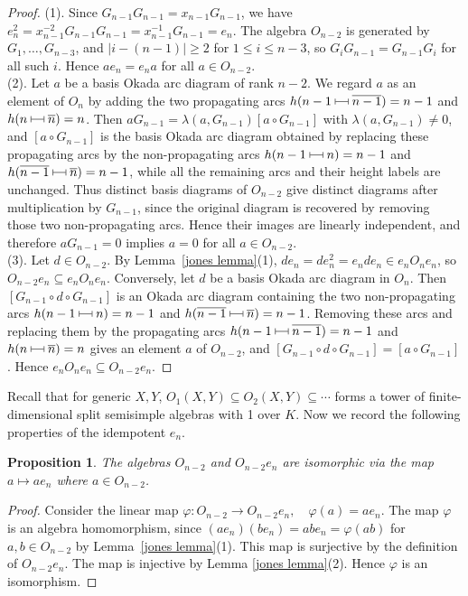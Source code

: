 \documentclass[12pt,reqno]{amsart}
\numberwithin{equation}{section}
\newtheorem{proposition}[theorem]{Proposition}
\theoremstyle{definition}
\theoremstyle{definition}
\newcommand{\arcjoin}{\mathrel{%
  \rule[0.1ex]{0.4pt}{1.1ex}%
  \rule[0.6ex]{1em}{0.4pt}%
  \rule[0.1ex]{0.4pt}{1.1ex}%
}}
\begin{document}
\begin{proof}
(1). Since $G_{n-1}G_{n-1}=x_{n-1}G_{n-1}$, we have
$e_n^2=x_{n-1}^{-2}G_{n-1}G_{n-1}=x_{n-1}^{-1}G_{n-1}=e_n$.
The algebra $O_{n-2}$ is generated by $G_1,\ldots,G_{n-3}$, and
$|i-(n-1)|\geq 2$ for $1\leq i\leq n-3$, so $G_iG_{n-1}=G_{n-1}G_i$ for all
such $i$. Hence $ae_n=e_na$ for all $a\in O_{n-2}$.
\vspace{2mm}
\\\noindent
(2). Let $a$ be a basis Okada arc diagram of rank $n-2$. We regard $a$ as an
element of $O_n$ by adding the two propagating arcs
$h(n-1\arcjoin\overline{n-1})=n-1$ and $h(n\arcjoin\overline n)=n$. Then
$aG_{n-1}=\lambda(a,G_{n-1})[a\circ G_{n-1}]$ with $\lambda(a,G_{n-1})\neq0$,
and $[a\circ G_{n-1}]$ is the basis Okada arc diagram obtained by replacing
these propagating arcs by the non-propagating arcs $h(n-1\arcjoin n)=n-1$ and
$h(\overline{n-1}\arcjoin\overline n)=n-1$, while all the remaining arcs and
their height labels are unchanged. Thus distinct basis diagrams of $O_{n-2}$
give distinct diagrams after multiplication by $G_{n-1}$, since the original
diagram is recovered by removing those two non-propagating arcs. Hence their
images are linearly independent, and therefore $aG_{n-1}=0$ implies $a=0$ for
all $a\in O_{n-2}$.
\vspace{2mm}
\\\noindent
(3). Let $d\in O_{n-2}$. By Lemma~\ref{jones lemma}(1), $de_n=de_n^2=e_nde_n\in e_nO_ne_n$, so
$O_{n-2}e_n\subseteq e_nO_ne_n$. Conversely, let $d$ be a basis Okada arc
diagram in $O_n$. Then $[G_{n-1}\circ d\circ G_{n-1}]$ is an Okada arc diagram
containing the two non-propagating arcs $h(n-1\arcjoin n)=n-1$ and
$h(\overline{n-1}\arcjoin\overline n)=n-1$. Removing these arcs and replacing
them by the propagating arcs $h(n-1\arcjoin\overline{n-1})=n-1$ and
$h(n\arcjoin\overline n)=n$ gives an element $a$ of $O_{n-2}$, and
$[G_{n-1}\circ d\circ G_{n-1}]=[a\circ G_{n-1}]$. Hence
$e_nO_ne_n\subseteq O_{n-2}e_n$.
\end{proof}
Recall that for generic $X,Y$, $O_1(X,Y) \subseteq O_2(X,Y) \subseteq \cdots $ forms a tower of finite-dimensional split semisimple algebras with 1 over $K$. Now we record the following properties of the idempotent $e_n$.
\begin{proposition}\label{idempotent}
   The algebras $O_{n-2}$ and $O_{n-2}e_n$ are isomorphic via the map $a \mapsto a e_n$ where $a \in O_{n-2}$.
\end{proposition}
\begin{proof}
 Consider the linear map
$\varphi:O_{n-2}\longrightarrow O_{n-2}e_n,\quad \varphi(a)=ae_n.$ The map $\varphi$ is an algebra homomorphism, since
$(ae_n)(be_n)=abe_n=\varphi(ab)$ for $a, b \in O_{n-2}$ by Lemma~\ref{jones lemma}(1).
This map is surjective by the definition of $O_{n-2}e_n$. The map is injective by Lemma \ref{jones lemma}(2). Hence $\varphi$ is an isomorphism.
\end{proof}
\end{document}

